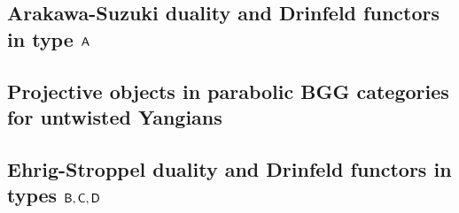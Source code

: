     \subsection{\texorpdfstring{Arakawa-Suzuki duality and Drinfeld functors in type $\mathsf{A}$}{}}

    \subsection{Projective objects in parabolic BGG categories for untwisted Yangians}

    \subsection{\texorpdfstring{Ehrig-Stroppel duality and Drinfeld functors in types $\mathsf{B}, \mathsf{C}, \mathsf{D}$}{}}